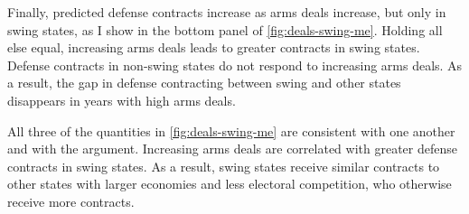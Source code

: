 \documentclass[12pt]{article}
\begin{document}
Finally, predicted defense contracts increase as arms deals increase, but only in swing states, as I show in the bottom panel of \autoref{fig:deals-swing-me}. 
Holding all else equal, increasing arms deals leads to greater contracts in swing states. 
Defense contracts in non-swing states do not respond to increasing arms deals.
As a result, the gap in defense contracting between swing and other states disappears in years with high arms deals. 


All three of the quantities in  \autoref{fig:deals-swing-me} are consistent with one another and with the argument. 
Increasing arms deals are correlated with greater defense contracts in swing states. 
As a result, swing states receive similar contracts to other states with larger economies and less electoral competition, who otherwise receive more contracts.  


%
%
%
%

%
%
\end{document}
